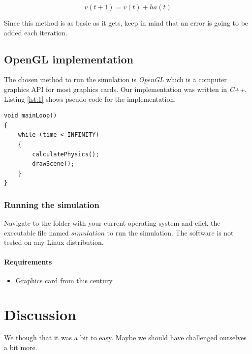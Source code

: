 \documentclass[a4paper,12pt]{report}
\begin{document}
\begin{equation}
v(t+1)=v(t)+ha(t)
\label{eq:6}
\end{equation}

Since this method is as basic as it gets, keep in mind that an error is going to be added each iteration.

\section{OpenGL implementation}

The chosen method to run the simulation is \emph{OpenGL} which is a computer graphics API for most graphics cards. Our implementation was written in \emph{C++}. Listing \ref{lst:1} shows pseudo code for the implementation.

\begin{lstlisting}[caption={Pseudo code for the simulation loop.}, label=lst:1]
void mainLoop()
{
    while (time < INFINITY)
    {
        calculatePhysics();
        drawScene();
    }
}
\end{lstlisting}

\subsection{Running the simulation}
Navigate to the folder with your current operating system and click the executable file named $simulation$ to run the simulation. The software is not tested on any Linux distribution.

\subsubsection{Requirements}
\begin{itemize}
    \item Graphics card from this century
\end{itemize}


\chapter{Discussion}

We though that it was a bit to easy. Maybe we should have challenged ourselves a bit more.






\end{document}
